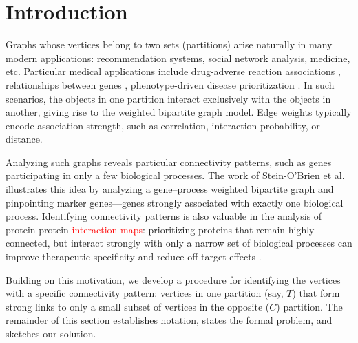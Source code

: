 \documentclass{llncs}
\newcommand{\red}[1]{\textcolor{red}{#1}}
\begin{document}

\section{Introduction}
Graphs whose vertices belong to two sets (partitions) arise naturally in many modern applications: recommendation systems, social network analysis, medicine, etc. Particular medical applications include drug-adverse
reaction associations \cite{timilsina2019discovering}, relationships between genes \cite{fertig_cogaps_2010, stein-obrien_enter_2018}, phenotype-driven disease prioritization  \cite{ullah2015estimating}. In such scenarios, the objects in one partition interact exclusively with the objects in another, giving rise to the weighted bipartite graph model. Edge weights typically encode association strength, such as correlation, interaction probability, or distance.

Analyzing such graphs reveals particular connectivity patterns, such as genes participating in only a few biological processes. The work of Stein-O’Brien et al. \cite{stein-obrien_patternmarkers_2017} illustrates this idea by analyzing a gene–process weighted bipartite graph and pinpointing marker genes---genes strongly associated with exactly one biological process. Identifying connectivity patterns is also valuable in the analysis of protein-protein \red{interaction maps}: prioritizing proteins that remain highly connected, but interact strongly with only a narrow set of biological processes can improve therapeutic specificity and reduce off-target effects \cite{viacava2021centrality}.

Building on this motivation, we develop a procedure for identifying the vertices with a specific connectivity pattern: vertices in one partition (say, $T$) that form strong links to only a small subset of vertices in the opposite ($C$) partition. The remainder of this section establishes notation, states the formal problem, and sketches our solution.
\end{document}
